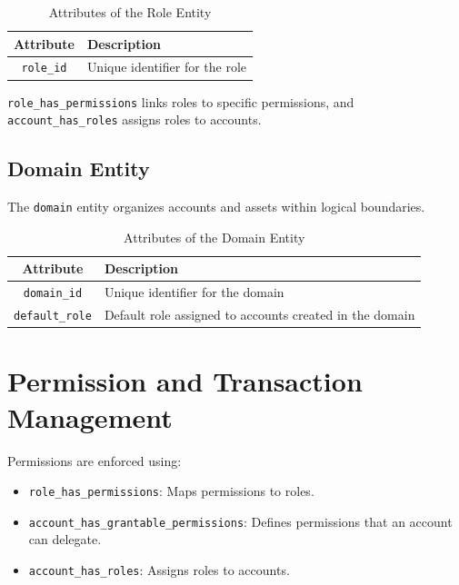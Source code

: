 \documentclass{article}
\begin{document}
\begin{table}[h]
    \centering
    \caption{Attributes of the Role Entity}
    \label{tab:role_attributes}
    \begin{tabular}{|c|l|}
        \hline
        \textbf{Attribute} & \textbf{Description}           \\ \hline
        \texttt{role\_id}  & Unique identifier for the role \\ \hline
    \end{tabular}
\end{table}

\texttt{role\_has\_permissions} links roles to specific permissions, and \texttt{account\_has\_roles} assigns roles to accounts.

\subsection{Domain Entity}
The \texttt{domain} entity organizes accounts and assets within logical boundaries.

\begin{table}[h]
    \centering
    \caption{Attributes of the Domain Entity}
    \label{tab:domain_attributes}
    \begin{tabular}{|c|l|}
        \hline
        \textbf{Attribute}     & \textbf{Description}                                    \\ \hline
        \texttt{domain\_id}    & Unique identifier for the domain                        \\ \hline
        \texttt{default\_role} & Default role assigned to accounts created in the domain \\ \hline
    \end{tabular}
\end{table}

\section{Permission and Transaction Management}
Permissions are enforced using:
\begin{itemize}
    \item \texttt{role\_has\_permissions}: Maps permissions to roles.
    \item \texttt{account\_has\_grantable\_permissions}: Defines permissions that an account can delegate.
    \item \texttt{account\_has\_roles}: Assigns roles to accounts.
\end{itemize}
\end{document}
